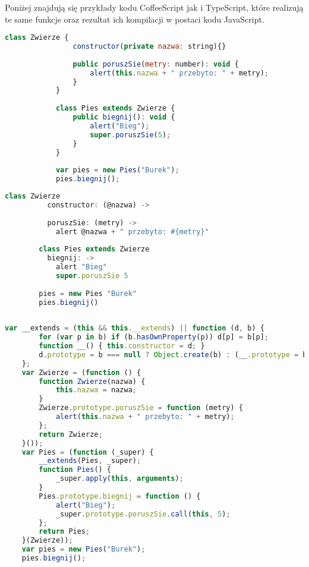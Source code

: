 Poniżej znajdują się przykłady kodu CoffeeScript jak i TypeScript, które realizują te same funkcje oraz rezultat ich kompilacji w postaci kodu JavaScript. 
 
\begin{minipage}[t]{.50\linewidth}
\begin{lstlisting}[language=JavaScript,basicstyle=\small,frame=top,title={Kod TypeScript}]
			class Zwierze {
			    constructor(private nazwa: string){}
			    
				public poruszSie(metry: number): void {
					alert(this.nazwa + " przebyto: " + metry);
				}
			}
			
			class Pies extends Zwierze {
				public biegnij(): void {
					alert("Bieg");
					super.poruszSie(5);
				}
			}
			
			var pies = new Pies("Burek");
			pies.biegnij();
		\end{lstlisting}
\end{minipage} 
\begin{minipage}[t]{.50\linewidth}
\begin{lstlisting}[language=JavaScript,basicstyle=\small,frame=top,title={Kod CoffeeScript}]
		class Zwierze
		  constructor: (@nazwa) ->
		
		  poruszSie: (metry) ->
		    alert @nazwa + " przebyto: #{metry}"
		
		class Pies extends Zwierze
		  biegnij: ->
		    alert "Bieg"
		    super.poruszSie 5
		    
		pies = new Pies "Burek"
		pies.biegnij()
		 
\end{lstlisting}
\end{minipage}

\begin{lstlisting}[language=JavaScript,basicstyle=\small,frame=top,title={Kod JavaScript}]
	var __extends = (this && this.__extends) || function (d, b) {
	    for (var p in b) if (b.hasOwnProperty(p)) d[p] = b[p];
	    function __() { this.constructor = d; }
	    d.prototype = b === null ? Object.create(b) : (__.prototype = b.prototype, new __());
	};
	var Zwierze = (function () {
	    function Zwierze(nazwa) {
	        this.nazwa = nazwa;
	    }
	    Zwierze.prototype.poruszSie = function (metry) {
	        alert(this.nazwa + " przebyto: " + metry);
	    };
	    return Zwierze;
	}());
	var Pies = (function (_super) {
	    __extends(Pies, _super);
	    function Pies() {
	        _super.apply(this, arguments);
	    }
	    Pies.prototype.biegnij = function () {
	        alert("Bieg");
	        _super.prototype.poruszSie.call(this, 5);
	    };
	    return Pies;
	}(Zwierze));
	var pies = new Pies("Burek");
	pies.biegnij();
\end{lstlisting} 	

